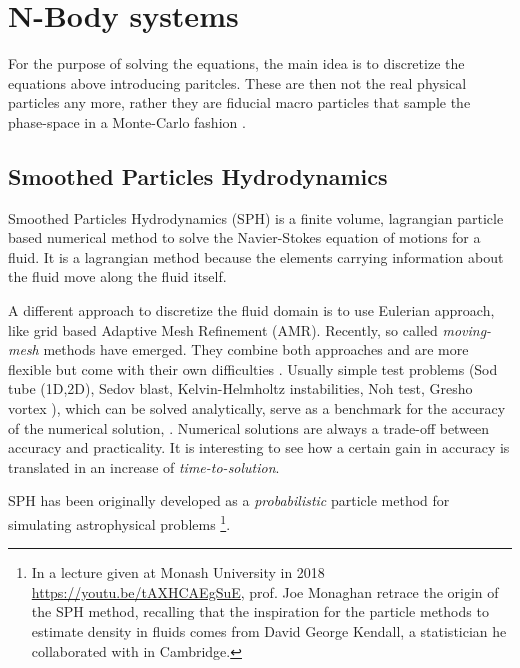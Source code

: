 \section{N-Body systems}
For the purpose of solving the equations, the main idea is to discretize the equations above introducing paritcles. These are then not the real physical particles any more, rather they are fiducial macro particles that sample the phase-space in a Monte-Carlo fashion \citep{Springel2015}.


\subsection{Smoothed Particles Hydrodynamics}
Smoothed Particles Hydrodynamics (SPH) is a finite volume, lagrangian particle based numerical method to solve the Navier-Stokes equation of motions for a fluid.
It is a lagrangian method because the elements carrying information about the fluid move along the fluid itself.

A different approach to discretize the fluid domain is to use Eulerian approach, like grid based Adaptive Mesh Refinement (AMR).
Recently, so called \emph{moving-mesh} methods have emerged. They combine both approaches and are more flexible but come with their own difficulties \citep{Springel2010, Shadowfax, Arepo}.
Usually simple test problems (Sod tube (1D,2D), Sedov blast, Kelvin-Helmholtz instabilities, Noh test, Gresho vortex \citet{Gresho1990}), %
which can be solved analytically, serve as a benchmark for the accuracy of the numerical solution, \citep[e.g. by measuring the distance of the two solution with an L2-norm in the whole domain, ][]{BorrowSphenix}.
Numerical solutions are always a trade-off between accuracy and practicality.
It is interesting to see how a certain gain in accuracy is translated in an increase of \emph{time-to-solution}.

SPH has been originally developed as a \emph{probabilistic} particle method for simulating astrophysical problems \citep{Lucy1977, Gingold1977}\footnote{In a lecture given at Monash University in 2018 \url{https://youtu.be/tAXHCAEgSuE}, prof. Joe Monaghan retrace the origin of the SPH method, recalling that the inspiration for the particle methods to estimate density in fluids comes from David George Kendall, a statistician he collaborated with in Cambridge.}.

